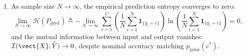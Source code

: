 \begin{theorem}
\begin{enumerate}
    \begin{equation}
    \operatorname{diam}\left( \mat{W}_L \phi_r(\mathcal{X}) \right) < \Delta_{\text{margin}}.
    \label{eq:diameter_contraction_inequality}
    \end{equation}
    Consequently, all inputs $\vect{x} \in \mathcal{X}$ are mapped to the same side of every separating hyperplane, falling entirely within the Voronoi cell of the class with the largest empirical prior: $c^* = \arg\max_c p_{\text{prior}}(c)$.
    \item As sample size $N \to \infty$, the empirical prediction entropy converges to zero:
    \begin{equation}
    \lim_{N \to \infty} \mathcal{H}(P_{\text{pred}}) \triangleq - \lim_{N \to \infty} \sum_{c=1}^C \left( \frac{1}{N} \sum_{i=1}^N \mathbf{1}_{\{\widehat{y}_i = c\}} \right) \ln\left( \frac{1}{N} \sum_{i=1}^N \mathbf{1}_{\{\widehat{y}_i = c\}} \right) = 0,
    \label{eq:entropy_collapse}
    \end{equation}
    and the mutual information between input and output vanishes: $\mathcal{I}(\vect{X}; \widehat{Y}) \to 0$, despite nominal accuracy matching $p_{\text{prior}}(c^*)$.
\end{enumerate}
\end{theorem}

